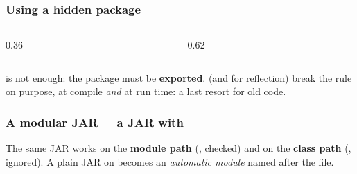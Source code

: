 \documentclass[aspectratio=169,10pt,compress]{beamer}
\begin{document}
\begin{frame}[t,fragile] \frametitle{Using a hidden package}
  \begin{columns}[T]
    \begin{column}{0.36\textwidth}
    \end{column}
    \begin{column}{0.62\textwidth}
    \end{column}
  \end{columns}

  \vspace{0.1em}
  \small {} is not enough: the package must be \textbf{exported}. 
  (and  for reflection) break the rule on purpose, at compile \emph{and} at run time: a last resort for old code.
\end{frame}





\begin{frame}[t,fragile] \frametitle{A modular JAR = a JAR with }

  \vspace{0.1em}
  \small
  The same JAR works on the \textbf{module path} (, checked) and on the \textbf{class path} (,
   ignored). A plain JAR on  becomes an \emph{automatic module} named after the file.
\end{frame}
\end{document}
